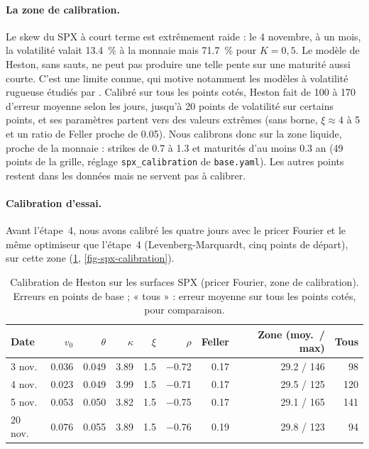 \paragraph{La zone de calibration.} Le skew du SPX à court terme est extrêmement raide : le 4 novembre, à un mois,
la volatilité valait \SI{13.4}{\percent} à la monnaie mais \SI{71.7}{\percent} pour $K = 0{,}5$. Le modèle de
Heston, sans sauts, ne peut pas produire une telle pente sur une maturité aussi courte. C'est une limite connue,
qui motive notamment les modèles à volatilité rugueuse étudiés par \citet{horvath2021}. Calibré sur tous les points
cotés, Heston fait de \SI{100}{\pb} à \SI{170}{\pb} d'erreur moyenne selon les jours, jusqu'à 20 points de
volatilité sur certains points, et ses paramètres partent vers des valeurs extrêmes (sans borne, $\xi \approx 4$ à 5
et un ratio de Feller proche de \num{0.05}). Nous calibrons donc sur la zone liquide,
proche de la monnaie : strikes de \num{0.7} à \num{1.3} et maturités d'au moins \num{0.3} an (49 points de la grille,
réglage \texttt{spx\_calibration} de \texttt{base.yaml}). Les autres points restent dans les données mais ne servent
pas à calibrer.

\paragraph{Calibration d'essai.} Avant l'étape~4, nous avons calibré les quatre jours avec le pricer Fourier et le
même optimiseur que l'étape~4 (Levenberg-Marquardt, cinq points de départ), sur cette zone
(\cref{tab-spx-calibration}, \cref{fig-spx-calibration}).

\begin{table}[H]
  \centering
  \caption{Calibration de Heston sur les surfaces SPX (pricer Fourier, zone de calibration). Erreurs en points de
  base ; « tous » : erreur moyenne sur tous les points cotés, pour comparaison.}
  \label{tab-spx-calibration}
  \begin{tabular}{lrrrrrrrr}
    \toprule
    Date & $v_0$ & $\theta$ & $\kappa$ & $\xi$ & $\rho$ & Feller & Zone (moy.~/ max) & Tous \\
    \midrule
    3 nov.  & \num{0.036} & \num{0.049} & \num{3.89} & \num{1.5} & \num{-0.72} & \num{0.17} & \num{29.2} / 146 & 98 \\
    4 nov.  & \num{0.023} & \num{0.049} & \num{3.99} & \num{1.5} & \num{-0.71} & \num{0.17} & \num{29.5} / 125 & 120 \\
    5 nov.  & \num{0.053} & \num{0.050} & \num{3.82} & \num{1.5} & \num{-0.75} & \num{0.17} & \num{29.1} / 165 & 141 \\
    20 nov. & \num{0.076} & \num{0.055} & \num{3.89} & \num{1.5} & \num{-0.76} & \num{0.19} & \num{29.8} / 123 & 94 \\
    \bottomrule
  \end{tabular}
\end{table}

